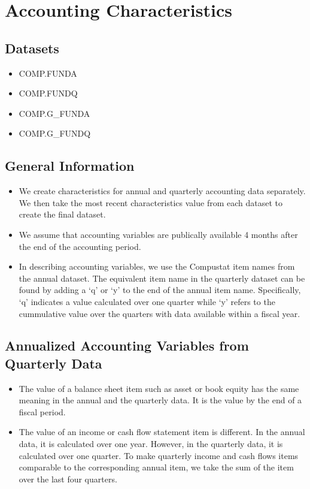 \documentclass[12pt,title,fleqn]{article}
\begin{document}
\section{Accounting Characteristics}
\subsection{Datasets}
\begin{itemize}
	\item COMP.FUNDA
	\item COMP.FUNDQ
	\item COMP.G\_FUNDA
	\item COMP.G\_FUNDQ
\end{itemize}



\subsection{General Information}
\begin{itemize}
	\item  We create characteristics for annual and quarterly accounting data separately. We then take the most recent characteristics value from each dataset to create the final dataset. 
	
	\item We assume that accounting variables are publically available 4 months after the end of the accounting period.  
	
	\item In describing accounting variables, we use the Compustat item names from the annual dataset. The equivalent item name in the quarterly dataset can be found by adding a ‘q’ or ‘y’ to the end of the annual item name. Specifically, ‘q’ indicates a value calculated over one quarter while ‘y’ refers to the cummulative value over the quarters with data available within a fiscal year.  
\end{itemize}

\subsection{Annualized Accounting Variables from Quarterly Data}
\begin{itemize}
	\item The value of a balance sheet item such as asset or book equity has the same meaning in the annual and the quarterly data. It is the value by the end of a fiscal period. 
	
	\item The value of an income or cash flow statement item is different. In the annual data, it is calculated over one year. However, in the quarterly data, it is calculated over one quarter. To make quarterly income and cash flows items comparable to the corresponding annual item, we take the sum of the item over the last four quarters. 
\end{itemize}
\end{document}
